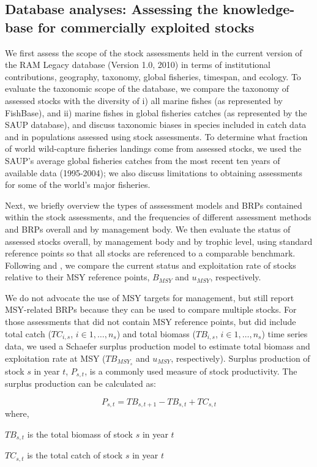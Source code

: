 \documentclass[letterpaper,12pt]{article}
\begin{document}
\subsection*{Database analyses: Assessing the knowledge-base for commercially exploited stocks}
We first assess the scope of the stock assessments held in the current
version of the RAM Legacy database (Version 1.0, 2010) in terms of
institutional contributions, geography, taxonomy, global fisheries,
timespan, and ecology. To evaluate the taxonomic scope of the
database, we compare the taxonomy of assessed stocks with the
diversity of i) all marine fishes (as represented by FishBase), and
ii) marine fishes in global fisheries catches (as represented by the
SAUP database), and discuss taxonomic biases in species included in
catch data and in populations assessed using stock assessments. To
determine what fraction of world wild-capture fisheries landings come
from assessed stocks, we used the SAUP's average global fisheries
catches from the most recent ten years of available data (1995-2004);
we also discuss limitations to obtaining assessments for some of the
world's major fisheries.

Next, we briefly overview the types of asssessment models and BRPs
contained within the stock assessments, and the frequencies of
different assessment methods and BRPs overall and by management body.
We then evaluate the status of assessed stocks overall, by management
body and by trophic level, using standard reference points so that all
stocks are referenced to a comparable benchmark.  Following
\cite{Froese:Proelss:2010:fandf} and \cite{Worm:etal:2009:science}, we
compare the current status and exploitation rate of stocks relative
to their MSY reference points, $B_{MSY}$ and $u_{MSY}$, respectively. 

We do not advocate the use of MSY targets for management, but still
report MSY-related BRPs because they can be used to compare multiple
stocks.  For those assessments that did not contain MSY reference
points, but did include total catch ($TC_{i,s}$, $i \in
{1,\ldots,n_{s}}$) and total biomass ($TB_{i,s}$, $i \in
{1,\ldots,n_{s}}$) time series data, we used a Schaefer surplus
production model to estimate total biomass and exploitation rate at
MSY ($TB_{MSY_{s}}$ and $u_{MSY}$, respectively). Surplus production
of stock $s$ in year $t$, $P_{s,t}$, is a commonly used measure of
stock productivity. The surplus production can be calculated as:

\begin{equation}
P_{s,t}  = TB_{s,t+1} - TB_{s,t} + TC_{s,t}
\end{equation}
where,
\begin{description}
\item $TB_{s,t}$ is the total biomass of stock $s$ in year $t$
\item $TC_{s,t}$ is the total catch of stock $s$ in year $t$
\end{description}
\end{document}
